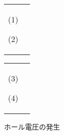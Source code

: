                     \begin{figure}[htbp]
                        \begin{tabular}{cc}
                            \begin{minipage}{0.5\hsize}
                                  \begin{center}
                                      {HallEfect2.pdf}

                                      (1)
                                  \end{center}
                            \end{minipage}
                            \begin{minipage}{0.5\hsize}
                                \begin{center}
                                    {HallEfect3.pdf}

                                      (2)
                                \end{center}
                            \end{minipage}
                        \end{tabular}
                    \end{figure}

                    \begin{figure}[htbp]
                        \begin{tabular}{cc}
                            \begin{minipage}{0.5\hsize}
                                  \begin{center}
                                      {HallEfect4.pdf}

                                      (3)
                                  \end{center}
                            \end{minipage}
                            \begin{minipage}{0.5\hsize}
                                \begin{center}
                                    {HallEfect5.pdf}

                                      (4)
                                \end{center}
                            \end{minipage}
                        \end{tabular}
                        \caption{ホール電圧の発生}
                        \label{fig:HallEfec_Mech} %
                    \end{figure}

